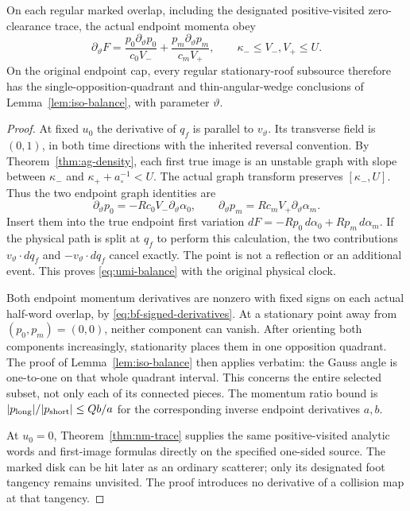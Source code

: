 \begin{lemma}
\label{lem:umi-balance}
On each regular marked overlap, including the designated
positive-visited zero-clearance trace, the actual endpoint
momenta obey
\begin{equation}\label{eq:umi-balance}
 \partial_\vartheta F
   =\frac{p_0\partial_\vartheta p_0}{c_0V_-}
       +\frac{p_m\partial_\vartheta p_m}{c_mV_+},
 \qquad \kappa_-\le V_-,V_+\le U.
\end{equation}
On the original endpoint cap, every regular stationary-roof
subsource therefore has the single-opposition-quadrant and
thin-angular-wedge conclusions of Lemma~\ref{lem:iso-balance},
with parameter $\vartheta$.
\end{lemma}
\begin{proof}
At fixed $u_0$ the derivative of $q_f$ is parallel to
$v_\vartheta$. Its transverse field is $(0,1)$, in both time
directions with the inherited reversal convention. By
Theorem~\ref{thm:ag-density}, each first true image is an unstable
graph with slope between $\kappa_-$ and
$\kappa_++a_\circ^{-1}<U$. The actual graph transform preserves
$[\kappa_-,U]$. Thus the two endpoint graph identities are
\[
 \partial_\vartheta p_0
      =-Rc_0V_-\partial_\vartheta\alpha_0,
 \qquad
 \partial_\vartheta p_m
      =Rc_mV_+\partial_\vartheta\alpha_m.
\]
Insert them into the true endpoint first variation
$dF=-Rp_0\,d\alpha_0+Rp_m\,d\alpha_m$.
If the physical path is split at $q_f$ to perform this calculation,
the two contributions $v_\vartheta\cdot dq_f$ and
$-v_\vartheta\cdot dq_f$ cancel exactly. The point is not a
reflection or an additional event. This proves
\eqref{eq:umi-balance} with the original physical clock.

Both endpoint momentum derivatives are nonzero with fixed signs
on each actual half-word overlap, by
\eqref{eq:bf-signed-derivatives}. At a stationary point away from
$(p_0,p_m)=(0,0)$, neither component can vanish. After orienting
both components increasingly, stationarity places them in one
opposition quadrant. The proof of Lemma~\ref{lem:iso-balance}
then applies verbatim: the Gauss angle is one-to-one on that
whole quadrant interval. This concerns the entire selected
subset, not only each of its connected pieces. The momentum
ratio bound is $|p_{\rm long}|/|p_{\rm short}|\le Qb/a$ for
the corresponding inverse endpoint derivatives $a,b$.

At $u_0=0$, Theorem~\ref{thm:nm-trace} supplies the same
positive-visited analytic words and first-image formulas directly
on the specified one-sided source. The marked disk can be hit
later as an ordinary scatterer; only its designated foot tangency
remains unvisited. The proof introduces no derivative of a
collision map at that tangency.
\end{proof}

